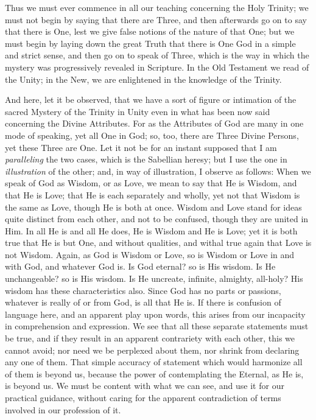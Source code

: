 Thus we must ever commence in all our teaching concerning the Holy
Trinity; we must not begin by saying that there are Three, and then
afterwards go on to say that there is One, lest we give false notions
of the nature of that One; but we must begin by laying down the great
Truth that there is One God in a simple and strict sense, and then go
on to speak of Three, which is the way in which the mystery was
progressively revealed in Scripture. In the Old Testament we read of
the Unity; in the New, we are enlightened in the knowledge of the
Trinity.

And here, let it be observed, that we have a sort of figure or
intimation of the sacred Mystery of the Trinity in Unity even in what
has been now said concerning the Divine Attributes. For as the
Attributes of God are many in one mode of speaking, yet all One in
God; so, too, there are Three Divine Persons, yet these Three are One.
Let it not be for an instant supposed that I am \emph{paralleling} the
two cases, which is the Sabellian heresy; but I use the one in \emph{illustration}
of the other; and, in way of illustration, I observe as follows: When
we speak of God as Wisdom, or as Love, we mean to say that He is
Wisdom, and that He is Love; that He is each separately and wholly,
yet not that Wisdom is the same as Love, though He is both at once.
Wisdom and Love stand for ideas quite distinct from each other, and
not to be confused, though they are united in Him. In all He is and
all He does, He is Wisdom and He is Love; yet it is both true that He
is but One, and without qualities, and withal true again that Love is
not Wisdom. Again, as God is Wisdom or Love, so is Wisdom or Love in
and with God, and whatever God is. Is God eternal? so is His wisdom.
Is He unchangeable? so is His wisdom. Is He uncreate, infinite,
almighty, all-holy? His wisdom has these characteristics also. Since
God has no parts or passions, whatever is really of or from God, is
all that He is. If there is confusion of language here, and an
apparent play upon words, this arises from our incapacity in
comprehension and expression. We see that all these separate
statements must be true, and if they result in an apparent contrariety
with each other, this we cannot avoid; nor need we be perplexed about
them, nor shrink from declaring any one of them. That simple accuracy
of statement which would harmonize all of them is beyond us, because
the power of contemplating the Eternal, as He is, is beyond us. We
must be content with what we can see, and use it for our practical
guidance, without caring for the apparent contradiction of terms
involved in our profession of it.

